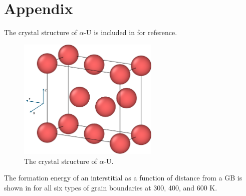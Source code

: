 \documentclass[review]{elsarticle}
\begin{document}
 \newpage
 
\section{Appendix}
\setcounter{figure}{0}
\setcounter{table}{0}
\renewcommand{\thefigure}{A\arabic{figure}}
\renewcommand{\thetable}{A\arabic{table}}
\setlength{\arrayrulewidth}{.5mm}
\setlength{\tabcolsep}{12pt}
\renewcommand{\arraystretch}{1.0}

The crystal structure of $\alpha$-U is included in  for reference.

\begin{figure}[h!]
\centering
\includegraphics[width=0.6\textwidth]{alphaU_struct.png}
\caption{The crystal structure of $\alpha$-U.}
\label{fig:alphaU_struct}
\end{figure}

The formation energy of an interstitial as a function of distance from a GB is shown in  for all six types of grain boundaries at 300, 400, and 600 K.
\end{document}

